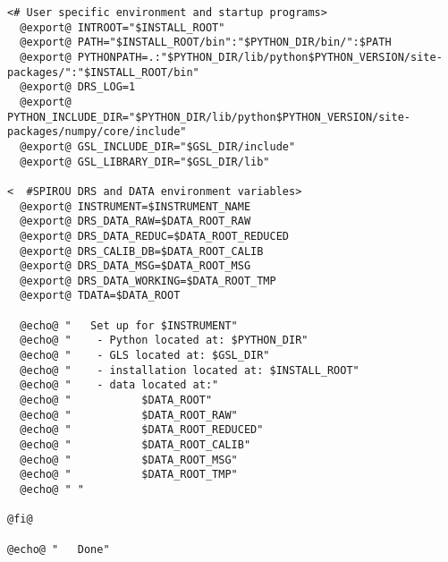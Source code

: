 \begin{lstlisting}[style=text]
  <# User specific environment and startup programs>
  @export@ INTROOT="$INSTALL_ROOT"
  @export@ PATH="$INSTALL_ROOT/bin":"$PYTHON_DIR/bin/":$PATH
  @export@ PYTHONPATH=.:"$PYTHON_DIR/lib/python$PYTHON_VERSION/site-packages/":"$INSTALL_ROOT/bin"
  @export@ DRS_LOG=1
  @export@ PYTHON_INCLUDE_DIR="$PYTHON_DIR/lib/python$PYTHON_VERSION/site-packages/numpy/core/include"
  @export@ GSL_INCLUDE_DIR="$GSL_DIR/include"
  @export@ GSL_LIBRARY_DIR="$GSL_DIR/lib"
  
<  #SPIROU DRS and DATA environment variables>
  @export@ INSTRUMENT=$INSTRUMENT_NAME
  @export@ DRS_DATA_RAW=$DATA_ROOT_RAW
  @export@ DRS_DATA_REDUC=$DATA_ROOT_REDUCED
  @export@ DRS_CALIB_DB=$DATA_ROOT_CALIB
  @export@ DRS_DATA_MSG=$DATA_ROOT_MSG
  @export@ DRS_DATA_WORKING=$DATA_ROOT_TMP
  @export@ TDATA=$DATA_ROOT
  
  @echo@ "   Set up for $INSTRUMENT"
  @echo@ "    - Python located at: $PYTHON_DIR"
  @echo@ "    - GLS located at: $GSL_DIR"
  @echo@ "    - installation located at: $INSTALL_ROOT"
  @echo@ "    - data located at:"
  @echo@ "           $DATA_ROOT"
  @echo@ "           $DATA_ROOT_RAW"
  @echo@ "           $DATA_ROOT_REDUCED"
  @echo@ "           $DATA_ROOT_CALIB"
  @echo@ "           $DATA_ROOT_MSG"
  @echo@ "           $DATA_ROOT_TMP"
  @echo@ " "
  
@fi@

@echo@ "   Done"


\end{lstlisting}  